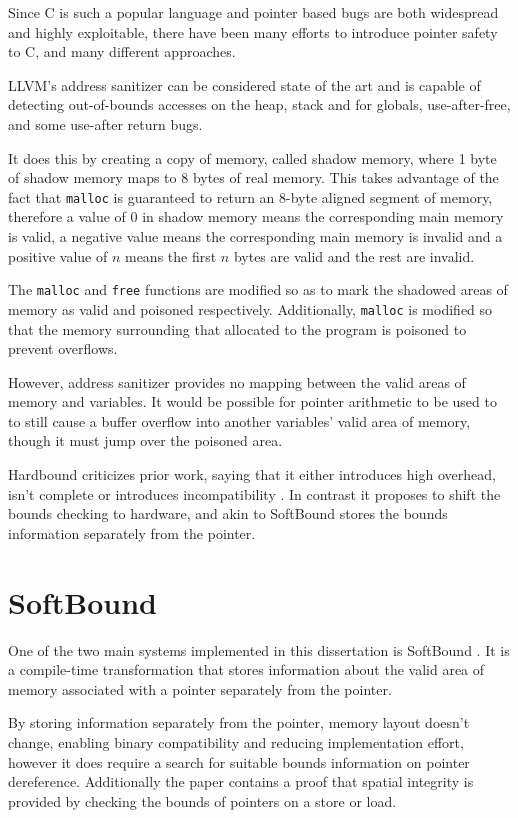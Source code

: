 Since C is such a popular language and pointer based bugs are both widespread and highly exploitable, there have been many efforts to introduce pointer safety to C, and many different approaches.

LLVM's address sanitizer \cite{llvmAddrSan, llvmAddrSanAlgo} can be considered state of the art and  is capable of detecting out-of-bounds accesses on the heap, stack and for globals, use-after-free, and some use-after return bugs.

It does this by creating a copy of memory, called shadow memory, where 1 byte of shadow memory maps to 8 bytes of real memory.
This takes advantage of the fact that \verb!malloc! is guaranteed to return an 8-byte aligned segment of memory, therefore a value of 0 in shadow memory means the corresponding main memory is valid, a negative value means the corresponding main memory is invalid and a positive value of $n$ means the first $n$ bytes are valid and the rest are invalid.

The \verb!malloc! and \verb!free! functions are modified so as to mark the shadowed areas of memory as valid and poisoned respectively.
Additionally, \verb!malloc! is modified so that the memory surrounding that allocated to the program is poisoned to prevent overflows.

However, address sanitizer provides no mapping between the valid areas of memory and variables.
It would be possible for pointer arithmetic to be used to to still cause a buffer overflow into another variables' valid area of memory, though it must jump over the poisoned area.

Hardbound criticizes prior work, saying that it either introduces high overhead, isn't complete or introduces incompatibility \cite{devietti2008hardbound}.
In contrast it proposes to shift the bounds checking to hardware, and akin to SoftBound stores the bounds information separately from the pointer.

\section{SoftBound}

One of the two main systems implemented in this dissertation is SoftBound \cite{nagarakatte2009softbound}.
It is a compile-time transformation that stores information about the valid area of memory associated with a pointer separately from the pointer.

By storing information separately from the pointer, memory layout doesn't change, enabling binary compatibility and reducing implementation effort, however it does require a search for suitable bounds information on pointer dereference.
Additionally the paper contains a proof that spatial integrity is provided by checking the bounds of pointers on a store or load.

